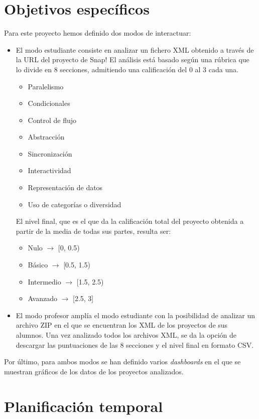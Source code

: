 \documentclass[a4paper, 12pt]{book}
\begin{document}
\section{Objetivos específicos}
\label{sec:objetivos-especificos}

Para este proyecto hemos definido dos modos de interactuar:
\begin{itemize}
\item 
El modo estudiante consiste en analizar un fichero XML obtenido a través de la URL del proyecto de Snap! El análisis está basado según una rúbrica que lo divide en 8 secciones, admitiendo una calificación del 0 al 3 cada una.
\begin{itemize}
      \item
     Paralelismo
      \item
     Condicionales
      \item
      Control de flujo
      \item
      Abstracción
      \item
      Sincronización
      \item
      Interactividad
      \item
      Representación de datos
      \item
      Uso de categorías o diversidad
    \end{itemize}
El nivel final, que es el que da la calificación total del proyecto obtenida a partir de la media de todas sus partes, resulta ser:
    \begin{itemize}
          \item
          Nulo $\rightarrow $ [0, 0.5)
          \item
          Básico $\rightarrow $ [0.5, 1.5)
          \item
          Intermedio $\rightarrow $ [1.5, 2.5)
          \item
          Avanzado $\rightarrow $ [2.5, 3]
     \end{itemize}
\item
El modo profesor amplía el modo estudiante con la posibilidad de analizar un archivo ZIP en el que se encuentran los XML de los proyectos de sus alumnos. Una vez analizado todos los archivos XML, se da la opción de descargar las puntuaciones  de las 8 secciones y el nivel final en formato CSV.

\end{itemize}
Por último, para ambos modos se han definido varios \emph{dashboards} en el que se muestran gráficos de los datos de los proyectos analizados.
\section{Planificación temporal}
\label{sec:planificacion-temporal}
\end{document}
